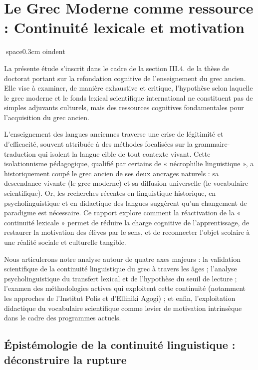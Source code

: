 

\section{Le Grec Moderne comme ressource : Continuité lexicale et motivation}
space{0.3cm}
oindent

La présente étude s'inscrit dans le cadre de la section III.4.\cite{ref2} de la thèse de doctorat
portant sur la refondation cognitive de l'enseignement du grec ancien. Elle vise à examiner, de
manière exhaustive et critique, l'hypothèse selon laquelle le grec moderne et le fonds lexical
scientifique international ne constituent pas de simples adjuvants culturels, mais des ressources
cognitives fondamentales pour l'acquisition du grec ancien.

L'enseignement des langues anciennes traverse une crise de légitimité et d'efficacité, souvent
attribuée à des méthodes focalisées sur la grammaire-traduction qui isolent la langue cible de tout
contexte vivant. Cette isolationnisme pédagogique, qualifié par certains de « nécrophilie
linguistique », a historiquement coupé le grec ancien de ses deux ancrages naturels : sa descendance
vivante (le grec moderne) et sa diffusion universelle (le vocabulaire scientifique). Or, les
recherches récentes en linguistique historique, en psycholinguistique et en didactique des langues
suggèrent qu'un changement de paradigme est nécessaire. Ce rapport explore comment la réactivation
de la « continuité lexicale » permet de réduire la charge cognitive de l'apprentissage, de restaurer
la motivation des élèves par le sens, et de reconnecter l'objet scolaire à une réalité sociale et
culturelle tangible.

Nous articulerons notre analyse autour de quatre axes majeurs : la validation scientifique de la
continuité linguistique du grec à travers les âges ; l'analyse psycholinguistique du transfert
lexical et de l'hypothèse du seuil de lecture ; l'examen des méthodologies actives qui exploitent
cette continuité (notamment les approches de l'Institut Polis et d'Elliniki Agogi) ; et enfin,
l'exploitation didactique du vocabulaire scientifique comme levier de motivation intrinsèque dans le
cadre des programmes actuels.



\subsection{Épistémologie de la continuité linguistique : déconstruire la rupture}

